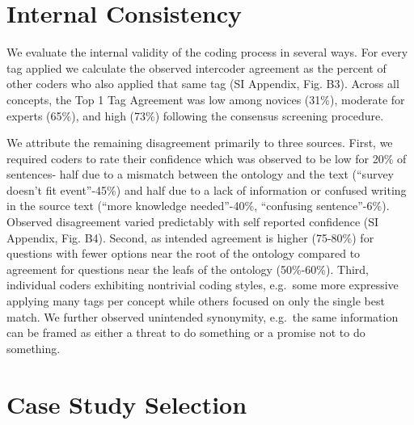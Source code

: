 \documentclass{article}
\begin{document}
\hypertarget{internal-consistency}{%
\section*{Internal Consistency}\label{internal-consistency}}

We evaluate the internal validity of the coding process in several ways.
For every tag applied we calculate the observed intercoder agreement as
the percent of other coders who also applied that same tag (SI Appendix,
Fig. B3). Across all concepts, the Top 1 Tag Agreement was low among
novices (31\%), moderate for experts (65\%), and high (73\%) following
the consensus screening procedure.

We attribute the remaining disagreement primarily to three sources.
First, we required coders to rate their confidence which was observed to
be low for 20\% of sentences- half due to a mismatch between the
ontology and the text (``survey doesn't fit event''-45\%) and half due
to a lack of information or confused writing in the source text (``more
knowledge needed''-40\%, ``confusing sentence''-6\%). Observed
disagreement varied predictably with self reported confidence (SI
Appendix, Fig. B4). Second, as intended agreement is higher (75-80\%)
for questions with fewer options near the root of the ontology compared
to agreement for questions near the leafs of the ontology (50\%-60\%).
Third, individual coders exhibiting nontrivial coding styles, e.g.~some
more expressive applying many tags per concept while others focused on
only the single best match. We further observed unintended synonymity,
e.g.~the same information can be framed as either a threat to do
something or a promise not to do something.

\hypertarget{case-study-selection}{%
\section*{Case Study Selection}\label{case-study-selection}}
\end{document}

